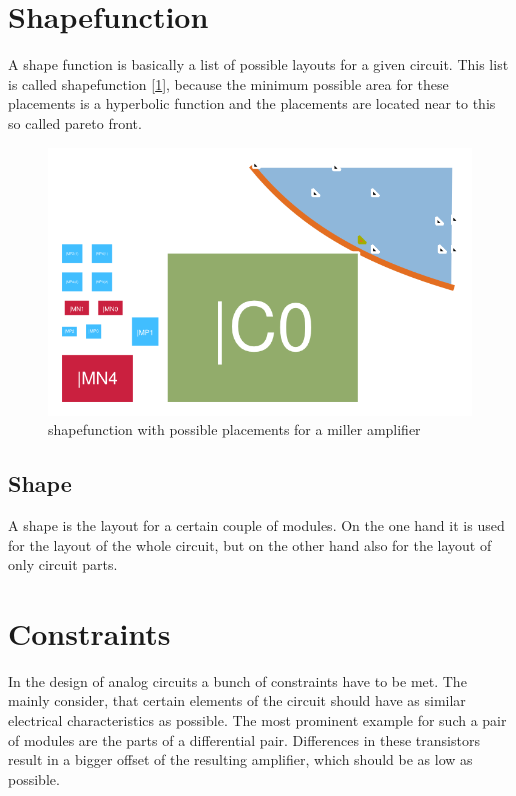 \section{Shapefunction}
A shape function is basically a list of possible layouts for a given circuit. This list is called shapefunction [\ref{fig:shapefunction}], because the minimum possible area for these placements is a hyperbolic function and the placements are located near to this so called pareto front.

\begin{figure}
	\centering
	\includegraphics[scale=1.8]{FIG/shapefunction.png}
	\caption{shapefunction with possible placements for a miller amplifier}
	\label{fig:shapefunction}
\end{figure}

\subsection{Shape}
A shape is the layout for a certain couple of modules. On the one hand it is used for the layout of the whole circuit, but on the other hand also for the layout of only circuit parts.

\section{Constraints}
In the design of analog circuits a bunch of constraints have to be met. The mainly consider, that certain elements of the circuit should have as similar electrical characteristics as possible. The most prominent example for such a pair of modules are the parts of a differential pair. Differences in these transistors result in a bigger offset of the resulting amplifier, which should be as low as possible.
